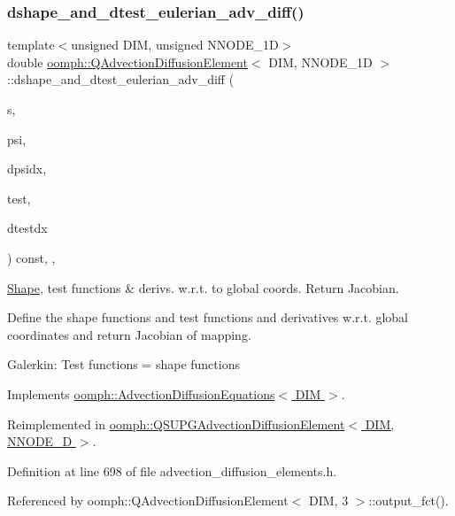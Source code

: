 \subsubsection{\texorpdfstring{dshape\+\_\+and\+\_\+dtest\+\_\+eulerian\+\_\+adv\+\_\+diff()}{dshape\_and\_dtest\_eulerian\_adv\_diff()}}
{\footnotesize\ttfamily template$<$unsigned D\+IM, unsigned N\+N\+O\+D\+E\+\_\+1D$>$ \\
double \hyperlink{classoomph_1_1QAdvectionDiffusionElement}{oomph\+::\+Q\+Advection\+Diffusion\+Element}$<$ D\+IM, N\+N\+O\+D\+E\+\_\+1D $>$\+::dshape\+\_\+and\+\_\+dtest\+\_\+eulerian\+\_\+adv\+\_\+diff (\begin{DoxyParamCaption}\item[{const \hyperlink{classoomph_1_1Vector}{Vector}$<$ double $>$ \&}]{s,  }\item[{\hyperlink{classoomph_1_1Shape}{Shape} \&}]{psi,  }\item[{\hyperlink{classoomph_1_1DShape}{D\+Shape} \&}]{dpsidx,  }\item[{\hyperlink{classoomph_1_1Shape}{Shape} \&}]{test,  }\item[{\hyperlink{classoomph_1_1DShape}{D\+Shape} \&}]{dtestdx }\end{DoxyParamCaption}) const\hspace{0.3cm}{\ttfamily [inline]}, {\ttfamily [protected]}, {\ttfamily [virtual]}}



\hyperlink{classoomph_1_1Shape}{Shape}, test functions \& derivs. w.\+r.\+t. to global coords. Return Jacobian. 

Define the shape functions and test functions and derivatives w.\+r.\+t. global coordinates and return Jacobian of mapping.

Galerkin\+: Test functions = shape functions 

Implements \hyperlink{classoomph_1_1AdvectionDiffusionEquations_ac3c3b0bec7f34f53eb330cd777dcbe59}{oomph\+::\+Advection\+Diffusion\+Equations$<$ D\+I\+M $>$}.



Reimplemented in \hyperlink{classoomph_1_1QSUPGAdvectionDiffusionElement_a07f5aafc7171048c0237574bf74ab265}{oomph\+::\+Q\+S\+U\+P\+G\+Advection\+Diffusion\+Element$<$ D\+I\+M, N\+N\+O\+D\+E\+\_\+D $>$}.



Definition at line 698 of file advection\+\_\+diffusion\+\_\+elements.\+h.



Referenced by oomph\+::\+Q\+Advection\+Diffusion\+Element$<$ D\+I\+M, 3 $>$\+::output\+\_\+fct().

